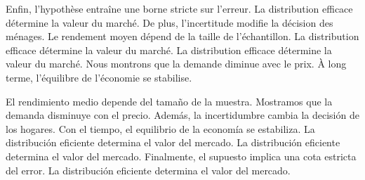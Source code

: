 \documentclass[11pt]{article}
\begin{document}
Enfin, l'hypothèse entraîne une borne stricte sur l'erreur. La distribution efficace détermine la valeur du marché. De plus, l'incertitude modifie la décision des ménages. Le rendement moyen dépend de la taille de l'échantillon. La distribution efficace détermine la valeur du marché. La distribution efficace détermine la valeur du marché. Nous montrons que la demande diminue avec le prix. À long terme, l'équilibre de l'économie se stabilise.

El rendimiento medio depende del tamaño de la muestra. Mostramos que la demanda disminuye con el precio. Además, la incertidumbre cambia la decisión de los hogares. Con el tiempo, el equilibrio de la economía se estabiliza. La distribución eficiente determina el valor del mercado. La distribución eficiente determina el valor del mercado. Finalmente, el supuesto implica una cota estricta del error. La distribución eficiente determina el valor del mercado.
\end{document}

